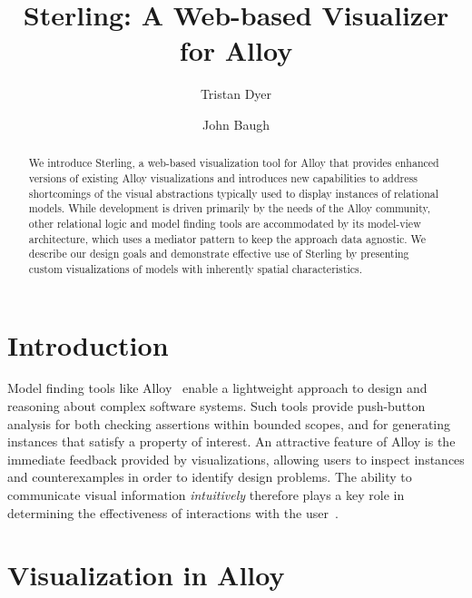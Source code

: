 \documentclass[runningheads]{llncs}
\begin{document}
\title{Sterling: A Web-based Visualizer for Alloy}
\author{Tristan Dyer  \and John Baugh }



\maketitle

\begin{abstract}
We introduce Sterling, a web-based visualization tool for Alloy that provides enhanced versions of existing Alloy visualizations and introduces new capabilities to address shortcomings of the visual abstractions typically used to display instances of relational models.
While development is driven primarily by the needs of the Alloy community, other relational logic and model finding tools are accommodated by its model-view architecture, which uses a mediator pattern to keep the approach data agnostic.
We describe our design goals and demonstrate effective use of Sterling by presenting custom visualizations of models with inherently spatial characteristics.
\end{abstract}


\section{Introduction}
\label{introduction}

Model finding tools like Alloy~\cite{jackson2012} enable a lightweight approach to design and reasoning about complex software systems. Such tools provide push-button analysis for both checking assertions within bounded scopes, and for generating instances that satisfy a property of interest. An attractive feature of Alloy is the immediate feedback provided by visualizations, allowing users to inspect instances and counterexamples in order to identify design problems. The ability to communicate visual information \emph{intuitively} therefore plays a key role in determining the effectiveness of interactions with the user~\cite{gammaitoni2014}.

\section{Visualization in Alloy}
\label{alloy-vis}
\end{document}
